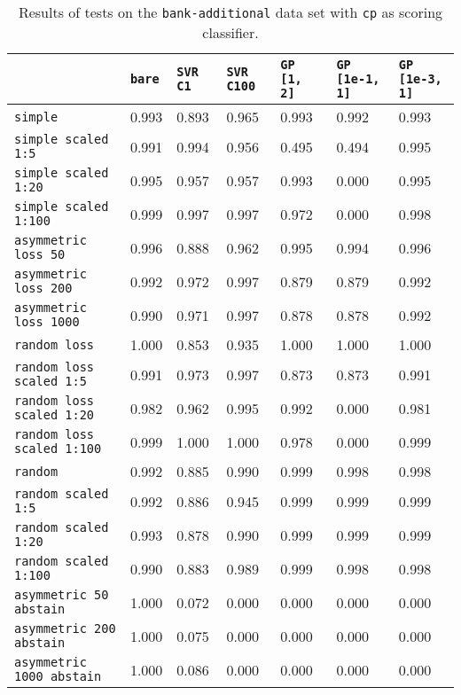 \begin{table}[H]
{\scriptsize
\begin{tabu}{l|l|l|l|l|l|l}
&\texttt{bare} &\texttt{SVR C1} &\texttt{SVR C100} &\texttt{GP [1, 2]} &\texttt{GP [1e-1, 1]} &\texttt{GP [1e-3, 1]}  \\
\hline
\texttt{simple} &0.993 &0.893 &0.965 &0.993 &0.992 &0.993 \\
\texttt{simple scaled 1:5} &0.991 &0.994 &0.956 &0.495 &0.494 &0.995 \\
\texttt{simple scaled 1:20} &0.995 &0.957 &0.957 &0.993 &0.000 &0.995 \\
\texttt{simple scaled 1:100} &0.999 &0.997 &0.997 &0.972 &0.000 &0.998 \\
\texttt{asymmetric loss 50} &0.996 &0.888 &0.962 &0.995 &0.994 &0.996 \\
\texttt{asymmetric loss 200} &0.992 &0.972 &0.997 &0.879 &0.879 &0.992 \\
\texttt{asymmetric loss 1000} &0.990 &0.971 &0.997 &0.878 &0.878 &0.992 \\
\texttt{random loss} &1.000 &0.853 &0.935 &1.000 &1.000 &1.000 \\
\texttt{random loss scaled 1:5} &0.991 &0.973 &0.997 &0.873 &0.873 &0.991 \\
\texttt{random loss scaled 1:20} &0.982 &0.962 &0.995 &0.992 &0.000 &0.981 \\
\texttt{random loss scaled 1:100} &0.999 &1.000 &1.000 &0.978 &0.000 &0.999 \\
\texttt{random} &0.992 &0.885 &0.990 &0.999 &0.998 &0.998 \\
\texttt{random scaled 1:5} &0.992 &0.886 &0.945 &0.999 &0.999 &0.999 \\
\texttt{random scaled 1:20} &0.993 &0.878 &0.990 &0.999 &0.999 &0.999 \\
\texttt{random scaled 1:100} &0.990 &0.883 &0.989 &0.999 &0.998 &0.998 \\
\texttt{asymmetric 50 abstain} &1.000 &0.072 &0.000 &0.000 &0.000 &0.000 \\
\texttt{asymmetric 200 abstain} &1.000 &0.075 &0.000 &0.000 &0.000 &0.000 \\
\texttt{asymmetric 1000 abstain} &1.000 &0.086 &0.000 &0.000 &0.000 &0.000 \\
\end{tabu} }
\caption{Results of tests on the \texttt{bank-additional} data set
         with \texttt{cp} as scoring classifier.}
\end{table}

